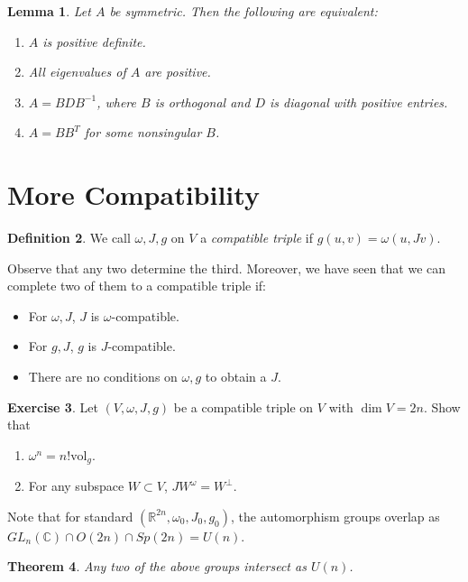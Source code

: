 \documentclass[leqno, openany]{memoir}
\newtheorem{thm}{Theorem}[chapter]
\newtheorem{lem}[thm]{Lemma}
\theoremstyle{definition}
\newtheorem{defn}[thm]{Definition}
\newtheorem{exer}[thm]{Exercise}
\theoremstyle{remark}
\theoremstyle{plain}
\theoremstyle{definition}
\theoremstyle{remark}
\newcommand{\R}{\mathbb{R}}
\renewcommand{\C}{\mathbb{C}}
\newcommand{\mr}[1]{\mathrm{#1}}
\begin{document}
\begin{lem}
    Let $A$ be symmetric. Then the following are equivalent:
    \begin{enumerate}
        \item $A$ is positive definite.
        \item All eigenvalues of $A$ are positive.
        \item $A = BDB^{-1}$, where $B$ is orthogonal and $D$ is diagonal with positive entries.
        \item $A = BB^T$ for some nonsingular $B$.
    \end{enumerate}
\end{lem}

\section{More Compatibility}%
\label{sec:more_compatibility}

\begin{defn}
    We call $\omega, J, g$ on $V$ a \textit{compatible triple} if $g(u, v) = \omega(u, Jv)$.
\end{defn}

Observe that any two determine the third. Moreover, we have seen that we can complete two of them to a compatible triple if:
\begin{itemize}
    \item For $\omega, J$, $J$ is $\omega$-compatible.
    \item For $g, J$, $g$ is $J$-compatible.
    \item There are no conditions on $\omega, g$ to obtain a $J$.
\end{itemize}

\begin{exer}
    Let $(V, \omega, J, g)$ be a compatible triple on $V$ with $\dim V = 2n$. Show that 
    \begin{enumerate}[label=(\alph*)]
        \item $\omega^n = n! \mr{vol}_g$.
        \item For any subspace $W \subset V$, $J W^{\omega} = W^{\perp}$.
    \end{enumerate}
\end{exer}

Note that for standard $(\R^{2n}, \omega_0, J_0, g_0)$, the automorphism groups overlap as $GL_n(\C) \cap O(2n) \cap Sp(2n) = U(n)$.

\begin{thm}
    Any two of the above groups intersect as $U(n)$.
\end{thm}
\end{document}
